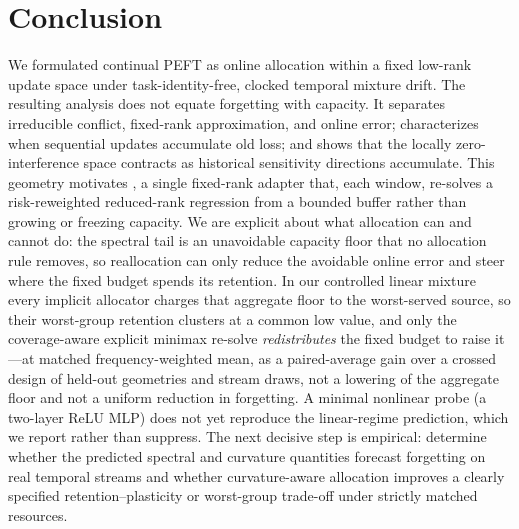 \section{Conclusion}
\label{sec:conclusion}

We formulated continual PEFT as online allocation within a fixed low-rank
update space under task-identity-free, clocked temporal mixture drift. The resulting analysis
does not equate forgetting with capacity. It separates irreducible conflict,
fixed-rank approximation, and online error; characterizes when sequential
updates accumulate old loss; and shows that the locally zero-interference space
contracts as historical sensitivity directions accumulate. This geometry
motivates \method{}, a single fixed-rank adapter that, each window, re-solves a
risk-reweighted reduced-rank regression from a bounded buffer rather than growing
or freezing capacity. We are explicit about what allocation can and cannot do:
the spectral tail is an unavoidable capacity floor that no allocation rule
removes, so reallocation can only reduce the avoidable online error and steer
where the fixed budget spends its retention. In our controlled linear mixture
every implicit allocator charges that aggregate floor to the worst-served
source, so their worst-group retention clusters at a common low value, and only
the coverage-aware explicit minimax re-solve \emph{redistributes} the fixed
budget to raise it---at matched frequency-weighted mean, as a paired-average gain
over a crossed design of held-out geometries and stream draws, not a lowering of
the aggregate floor and not a uniform reduction in forgetting. A minimal
nonlinear probe (a two-layer ReLU MLP) does not yet reproduce the
linear-regime prediction, which we report rather than suppress. The next decisive step is
empirical: determine whether the predicted spectral and curvature quantities
forecast forgetting on real temporal streams and whether curvature-aware
allocation improves a clearly specified retention--plasticity or worst-group
trade-off under strictly matched resources.
